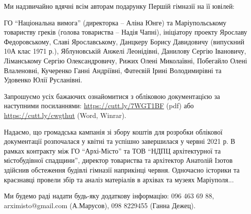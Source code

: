 Ми надзвичайно вдячні всім авторам подарунку Першій гімназії на її ювілей: 

ГО \enquote{Національна вимога} (директорка – Аліна Юнге) та Маріупольському товариству
греків (голова товариства – Надія Чапні), ініціатору проекту Ярославу
Федоровському, Славі Ярославському, Данцкеру Борису Давидовичу (випускний 10А
клас 1971 р.), Яблуновській Анжелі Леонідівні, Данилову Сергію Івановичу,
Ліманському Сергію Олександровичу, Рижих Олені Миколаївні, Побегайло Олені
Влаленовні, Кучеренко Ганні Андріївні, Фатеєвій Ірині Володимирівні та Удовенко
Юлії Русланівні.

Запрошуємо усіх бажаючих ознайомитися з обліковою документацією за наступними
посиланнями: \url{https://cutt.ly/7WGT1BF} (pdf) або \url{https://cutt.ly/cwgthut} (Word,
Winrar).

Надаємо, що громадська кампанія зі збору коштів для розробки облікової
документації розпочалася у квітні та успішно завершилася у червні 2021 р. В
рамках контракту між ГО \enquote{Архі-Місто} та ТОВ \enquote{НДПЦ архітектурної та
містобудівної спадщини}, директор товариства та архітектор Анатолій Ізотов
здійснив обстеження будівлі гімназії наприкінці червня. Одночасно історики та
краєзнавці провели збір та аналіз матеріалів в архівах та музеях Маріуполя...

Ми будемо раді надати будь-яку додаткову інформацію: 096 463 69 88,
arximisto@gmail.com (А.Марусов), 098 8229455 (Ганна Дежец).
